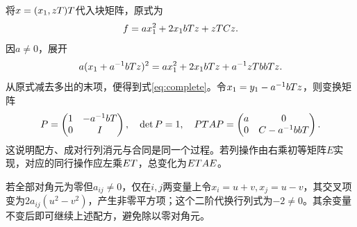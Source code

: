 \label{der:6-2}
将$x=(x_1,zT)T$代入块矩阵，原式为
\[f=a x_1^2+2x_1bTz+zT Cz.\]
因$a\ne0$，展开
\[a(x_1+a^{-1}bTz)^2=a x_1^2+2x_1bTz+a^{-1}zTbbTz.\]
从原式减去多出的末项，便得到式\eqref{eq:complete}。令$x_1=y_1-a^{-1}bTz$，则变换矩阵
\[P=\begin{pmatrix}1&-a^{-1}bT\\0&I\end{pmatrix},\quad\det P=1,
\quad PT AP=\begin{pmatrix}a&0\\0&C-a^{-1}bbT\end{pmatrix}.\]
这说明配方、成对行列消元与合同是同一个过程。若列操作由右乘初等矩阵$E$实现，对应的同行操作应左乘$ET$，总变化为$ET AE$。

若全部对角元为零但$a_{ij}\ne0$，仅在$i,j$两变量上令$x_i=u+v,x_j=u-v$，其交叉项变为$2a_{ij}(u^2-v^2)$，产生非零平方项；这个二阶代换行列式为$-2\ne0$。其余变量不变后即可继续上述配方，避免除以零对角元。
